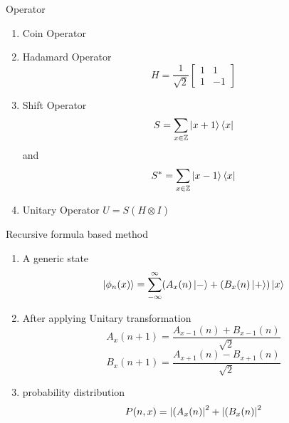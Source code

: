 \documentclass[xcolor=svgnames]{beamer}
\newcommand{\tens}[1]{
  \mathbin{\mathop{\otimes}\limits_{#1}}}
\begin{document}
\begin{frame}{Operator}
\begin{enumerate}
    \item Coin Operator
    \item Hadamard Operator $$H = \frac{1}{\sqrt{2}}\begin{bmatrix}
                                    1 & 1\\
                                    1 & -1
                                    \end{bmatrix}$$
    \item Shift Operator $$S = \sum_{x \in \mathbb{Z}} \ket{x+1}\bra{x}$$ and 
    $$S^* = \sum_{x \in \mathbb{Z}} \ket{x-1}\bra{x}$$
    \item Unitary Operator $U = S ( H \tens{} I)$
\end{enumerate}
    
\end{frame}

\begin{frame}{Recursive formula based method}
\begin{enumerate}
    \item A generic state $$\ket{\phi_n(x)} = \sum_{-\infty}^{\infty} (A_{x}(n)\ket{-} +(B_{x}(n)\ket{+}) \ket{x}$$
    \item After applying Unitary transformation $$A_{x}(n+1) = \dfrac{A_{x-1}(n) + B_{x-1}(n)}{\sqrt{2}}$$
    $$B_{x}(n+1) = \dfrac{A_{x+1}(n) - B_{x+1}(n)}{\sqrt{2}}$$ 
    \item probability distribution
          $$ P(n,x) = \abs{(A_{x}(n)}^2 + \abs{(B_{x}(n)}^2 $$
\end{enumerate}
    
\end{frame}
\end{document}
